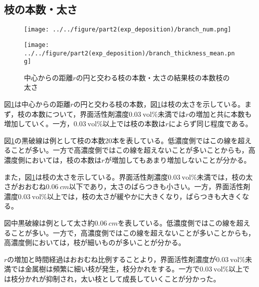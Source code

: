 \documentclass[autodetect-engine,dvi=dvipdfmx,a4paper,ja=standard,oneside,openany,11pt,draft]{bxjsbook}
\begin{document}
\subsection{枝の本数・太さ}
\begin{figure}[H]
  \begin{minipage}
    {0.45\textwidth}
    \subcaption{}
    \centering
    \texttt{[image: ../../figure/part2(exp\_deposition)/branch\_num.png]}
    \label{fig:branch_number}
  \end{minipage}
  \begin{minipage}
    {0.45\textwidth}
    \subcaption{}
    \centering
    \texttt{[image: ../../figure/part2(exp\_deposition)/branch\_thickness\_mean.png]}
    \label{fig:branch_thickness}
  \end{minipage}
  \caption{中心からの距離$r$の円と交わる枝の本数・太さの結果枝の本数枝の太さ}
  \label{fig:branch}
\end{figure}
図\ref{fig:branch}は中心からの距離$r$の円と交わる枝の本数，図\ref{fig:branch}は枝の太さを示している。まず，枝の本数について，界面活性剤濃度$\SI{0.03}{\mathrm{vol}\%}$未満では$r$の増加と共に本数も増加していく。一方，$\SI{0.03}{\mathrm{vol}\%}$以上では枝の本数は$r$によらず同じ程度である。

図\ref{fig:branch}の黒破線は例として枝の本数20本を表している。低濃度側ではこの線を超えることが多い。一方で高濃度側ではこの線を超えないことが多いことからも，高濃度側においては，枝の本数は$r$が増加してもあまり増加しないことが分かる。

また，図\ref{fig:branch}は枝の太さを示している。界面活性剤濃度$\SI{0.03}{\mathrm{vol}\%}$未満では，枝の太さがおおむね$\SI{0.06}{cm}$以下であり，太さのばらつきも小さい。一方，界面活性剤濃度$\SI{0.03}{\mathrm{vol}\%}$以上では，枝の太さが緩やかに大きくなり，ばらつきも大きくなる。

図中黒破線は例として太さ約$\SI{0.06}{cm}$を表している。低濃度側ではこの線を超えることが多い。一方で，高濃度側ではこの線を超えないことが多いことからも，高濃度側においては，枝が細いものが多いことが分かる。

$r$の増加と時間経過はおおむね比例することより，界面活性剤濃度が$\SI{0.03}{\mathrm{vol}\%}$未満では金属樹は頻繁に細い枝が発生，枝分かれをする。一方で$\SI{0.03}{\mathrm{vol}\%}$以上では枝分かれが抑制され，太い枝として成長していくことが分かった。
\end{document}
